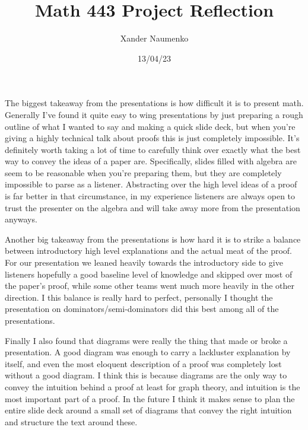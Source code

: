 \documentclass[letterpaper, reqno,11pt]{article}
\begin{document}
\title{Math 443 Project Reflection}
\date{13/04/23}
\author{Xander Naumenko}
\maketitle

The biggest takeaway from the presentations is how difficult it is to present math. Generally I've found it quite easy to wing presentations by just preparing a rough outline of what I wanted to say and making a quick slide deck, but when you're giving a highly technical talk about proofs this is just completely impossible. It's definitely worth taking a lot of time to carefully think over exactly what the best way to convey the ideas of a paper are. Specifically, slides filled with algebra are seem to be reasonable when you're preparing them, but they are completely impossible to parse as a listener. Abstracting over the high level ideas of a proof is far better in that circumstance, in my experience listeners are always open to trust the presenter on the algebra and will take away more from the presentation anyways.

Another big takeaway from the presentations is how hard it is to strike a balance between introductory high level explanations and the actual meat of the proof. For our presentation we leaned heavily towards the introductory side to give listeners hopefully a good baseline level of knowledge and skipped over most of the paper's proof, while some other teams went much more heavily in the other direction. I this balance is really hard to perfect, personally I thought the presentation on dominators/semi-dominators did this best among all of the presentations. 

Finally I also found that diagrams were really the thing that made or broke a presentation. A good diagram was enough to carry a lackluster explanation by itself, and even the most eloquent description of a proof was completely lost without a good diagram. I think this is because diagrams are the only way to convey the intuition behind a proof at least for graph theory, and intuition is the most important part of a proof. In the future I think it makes sense to plan the entire slide deck around a small set of diagrams that convey the right intuition and structure the text around these.
\end{document}
